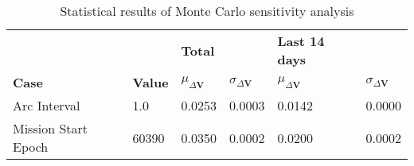 \begin{table}[h!]
\centering
\begin{tabular}{llllll}
 &  & \cellcolor[HTML]{EFEFEF}\textbf{Total} &  & \cellcolor[HTML]{EFEFEF}\textbf{Last 14 days} &  \\
\rowcolor[HTML]{EFEFEF} 
\textbf{Case} & \textbf{Value} & \textbf{$\mu_{\Delta \boldsymbol{V}}$} & \textbf{$\sigma_{\Delta \boldsymbol{V}}$} & \textbf{$\mu_{\Delta \boldsymbol{V}}$} & \textbf{$\sigma_{\Delta \boldsymbol{V}}$} \\ 
Arc Interval & 1.0 & 0.0253 & 0.0003 & 0.0142 & 0.0000 \\ 
Mission Start Epoch & 60390 & 0.0350 & 0.0002 & 0.0200 & 0.0002 \\ 
\end{tabular}
\caption{Statistical results of Monte Carlo sensitivity analysis}
\label{tab:SensitivityAnalysis}
\end{table}